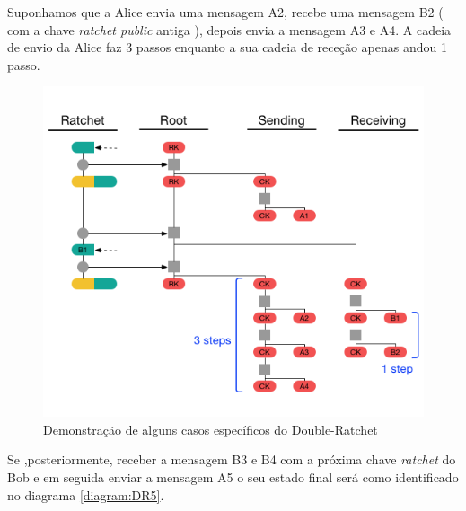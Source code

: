 Suponhamos que a Alice envia uma mensagem A2, recebe uma mensagem B2 ( com a chave \textit{ratchet public} antiga ), depois envia a mensagem A3 e A4. A cadeia de envio da Alice faz 3 passos enquanto a sua cadeia de receção apenas andou 1 passo.

\begin{figure}[H]
\begin{center}
\includegraphics[width=12cm]{img/DR4.png}
\caption{Demonstração de alguns casos específicos do Double-Ratchet}
\label{diagram:DR4} 
\centering
\end{center}
\end{figure}

Se ,posteriormente, receber a mensagem B3 e B4 com a próxima chave \textit{ratchet} do Bob e em seguida enviar a mensagem A5 o seu estado final será como identificado no diagrama \ref{diagram:DR5}.

